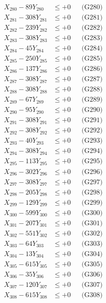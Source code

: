 \documentclass[a4paper,10pt]{article}
\begin{document}
{\begin{align}
X_{280} - 89Y_{280} &\leq +0 && \text{(G280)} \\
\allowbreak
X_{281} - 308Y_{281} &\leq +0 && \text{(G281)} \\
X_{282} - 239Y_{282} &\leq +0 && \text{(G282)} \\
X_{283} - 308Y_{283} &\leq +0 && \text{(G283)} \\
X_{284} - 45Y_{284} &\leq +0 && \text{(G284)} \\
X_{285} - 250Y_{285} &\leq +0 && \text{(G285)} \\
X_{286} - 137Y_{286} &\leq +0 && \text{(G286)} \\
X_{287} - 308Y_{287} &\leq +0 && \text{(G287)} \\
X_{288} - 308Y_{288} &\leq +0 && \text{(G288)} \\
X_{289} - 67Y_{289} &\leq +0 && \text{(G289)} \\
X_{290} - 95Y_{290} &\leq +0 && \text{(G290)} \\
\allowbreak
X_{291} - 308Y_{291} &\leq +0 && \text{(G291)} \\
X_{292} - 308Y_{292} &\leq +0 && \text{(G292)} \\
X_{293} - 40Y_{293} &\leq +0 && \text{(G293)} \\
X_{294} - 308Y_{294} &\leq +0 && \text{(G294)} \\
X_{295} - 113Y_{295} &\leq +0 && \text{(G295)} \\
X_{296} - 302Y_{296} &\leq +0 && \text{(G296)} \\
X_{297} - 308Y_{297} &\leq +0 && \text{(G297)} \\
X_{298} - 205Y_{298} &\leq +0 && \text{(G298)} \\
X_{299} - 129Y_{299} &\leq +0 && \text{(G299)} \\
X_{300} - 599Y_{300} &\leq +0 && \text{(G300)} \\
\allowbreak
X_{301} - 207Y_{301} &\leq +0 && \text{(G301)} \\
X_{302} - 551Y_{302} &\leq +0 && \text{(G302)} \\
X_{303} - 64Y_{303} &\leq +0 && \text{(G303)} \\
X_{304} - 13Y_{304} &\leq +0 && \text{(G304)} \\
X_{305} - 615Y_{305} &\leq +0 && \text{(G305)} \\
X_{306} - 35Y_{306} &\leq +0 && \text{(G306)} \\
X_{307} - 120Y_{307} &\leq +0 && \text{(G307)} \\
X_{308} - 615Y_{308} &\leq +0 && \text{(G308)} \\

\end{align}}
\end{document}
